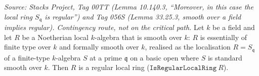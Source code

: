 \begin{theorem}

  \label{thm:smooth_local_isRegularLocalRing}
  \textit{Source: Stacks Project, Tag 00TT (Lemma 10.140.3, ``Moreover, in
  this case the local ring \(S_{\mathfrak q}\) is regular'') and Tag 056S
  (Lemma 33.25.3, smooth over a field implies regular). Contingency route,
  not on the critical path.}
  Let \(k\) be a field and let \(R\) be a Noetherian local \(k\)-algebra that
  is smooth over \(k\): \(R\) is essentially of finite type over \(k\) and
  formally smooth over \(k\), realised as the localisation \(R = S_{\mathfrak
  q}\) of a finite-type \(k\)-algebra \(S\) at a prime \(\mathfrak q\) on a
  basic open where \(S\) is standard smooth over \(k\). Then \(R\) is a
  regular local ring (\(\texttt{IsRegularLocalRing}\ R\)).
\end{theorem}

